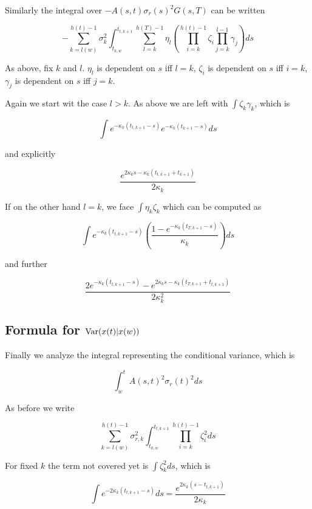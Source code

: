 \documentclass{amsart}
\theoremstyle{plain}
\numberwithin{equation}{section}
\begin{document}
Similarly the integral over $-A(s,t)\sigma_r(s)^2G(s,T)$ can be written

\begin{equation}
-\sum_{k=l(w)}^{h(t)-1} \sigma_k^2 \int_{t_{k,w}}^{t_{t,k+1}} \sum_{l=k}^{h(T)-1} \eta_l \left( \prod_{i=k}^{h(t)-1} \zeta_i   
   \prod_{j=k}^{l-1} \gamma_j  \right) ds
\end{equation}

As above, fix $k$ and $l$. $\eta_l$ is dependent on $s$ iff $l=k$, $\zeta_i$ is dependent on $s$ iff $i=k$, $\gamma_j$ is dependent on $s$ iff $j=k$. 

Again we start wit the case $l>k$. As above we are left with $\int \zeta_k \gamma_k$, which is

\begin{equation}
\int e^{-\kappa_k(t_{t,k+1}-s)} e^{-\kappa_k(t_{k+1}-s)} ds
\end{equation}

and explicitly

\begin{equation}
\frac{e^{2\kappa_ks-\kappa_k(t_{t,k+1}+t_{k+1})}}{2\kappa_k}
\end{equation}

If on the other hand $l=k$, we face $\int \eta_k\zeta_k$ which can be computed as

\begin{equation}
\int e^{-\kappa_k(t_{t,k+1}-s)} \left( \frac{1- e^{-\kappa_k(t_{T,k+1}-s)}}{\kappa_k} \right) ds
\end{equation}

and further 

\begin{equation}
\frac{2e^{-\kappa_k(t_{t,k+1}-s)} - e^{2\kappa_ks -\kappa_k(t_{T,k+1}+t_{t,k+1})}} {2\kappa_k^2}
\end{equation}

\subsection{Formula for $\textnormal{Var}(x(t) | x(w)) $}
Finally we analyze the integral representing the conditional variance, which is

\begin{equation}
\int_w^t A(s,t)^2 \sigma_r(t)^2 ds
\end{equation}

As before we write

\begin{equation}
\sum_{k=l(w)}^{h(t)-1} \sigma_{r,k}^2 \int_{t_{k,w}}^{t_{t,k+1}} \prod_{i=k}^{h(t)-1} \zeta_i^2 ds
\end{equation}

For fixed $k$ the term not covered yet is $\int \zeta_k^2 ds$, which is

\begin{equation}
\int e^{-2\kappa_k(t_{t,k+1}-s)} ds = \frac{e^{2\kappa_k(s-t_{t,k+1})} }{2\kappa_k}
\end{equation}
\end{document}
